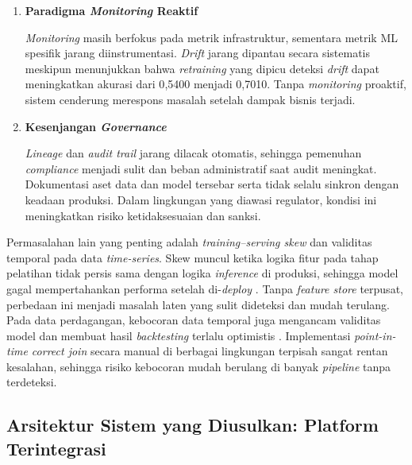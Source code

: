 \begin{enumerate}
    \vspace{0.5em}

    \item \textbf{Paradigma \textit{Monitoring} Reaktif}  

    \textit{Monitoring} masih berfokus pada metrik infrastruktur, sementara metrik ML spesifik jarang diinstrumentasi. \textit{Drift} jarang dipantau secara sistematis meskipun \textcite{jourdan2023handling} menunjukkan bahwa \textit{retraining} yang dipicu deteksi \textit{drift} dapat meningkatkan akurasi dari 0{,}5400 menjadi 0{,}7010. Tanpa \textit{monitoring} proaktif, sistem cenderung merespons masalah setelah dampak bisnis terjadi.

    \vspace{0.5em}

    \item \textbf{Kesenjangan \textit{Governance}}  

    \textit{Lineage} dan \textit{audit trail} jarang dilacak otomatis, sehingga pemenuhan \textit{compliance} menjadi sulit dan beban administratif saat audit meningkat. Dokumentasi aset data dan model tersebar serta tidak selalu sinkron dengan keadaan produksi. Dalam lingkungan yang diawasi regulator, kondisi ini meningkatkan risiko ketidaksesuaian dan sanksi.

    \vspace{0.5em}
\end{enumerate}

Permasalahan lain yang penting adalah \textit{training--serving skew} dan validitas temporal pada data \textit{time-series}. Skew muncul ketika logika fitur pada tahap pelatihan tidak persis sama dengan logika \textit{inference} di produksi, sehingga model gagal mempertahankan performa setelah di-\textit{deploy} \autocite{polyzotis2018data}. Tanpa \textit{feature store} terpusat, perbedaan ini menjadi masalah laten yang sulit dideteksi dan mudah terulang. Pada data perdagangan, kebocoran data temporal juga mengancam validitas model dan membuat hasil \textit{backtesting} terlalu optimistis \autocite{polyzotis2018data,wang2021leakage}. Implementasi \textit{point-in-time correct join} secara manual di berbagai lingkungan terpisah sangat rentan kesalahan, sehingga risiko kebocoran mudah berulang di banyak \textit{pipeline} tanpa terdeteksi.

\subsection{Arsitektur Sistem yang Diusulkan: Platform Terintegrasi}

